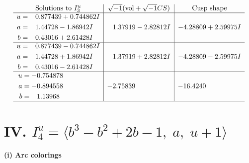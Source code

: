 \documentclass[1p]{elsarticle_modified}
\theoremstyle{definition}
\newcommand{\I}{\sqrt{-1}}
\begin{document}
$$\begin{array}{c|c|c}  
\text{Solutions to }I^u_{3}& \I (\text{vol} + \sqrt{-1}CS) & \text{Cusp shape}\\
 \hline 
\begin{aligned}
u &= \phantom{-}0.877439 + 0.744862 I \\
a &= \phantom{-}1.44728 - 1.86942 I \\
b &= \phantom{-}0.43016 + 2.61428 I\end{aligned}
 & \phantom{-}1.37919 - 2.82812 I & -4.28809 + 2.59975 I \\ \hline\begin{aligned}
u &= \phantom{-}0.877439 - 0.744862 I \\
a &= \phantom{-}1.44728 + 1.86942 I \\
b &= \phantom{-}0.43016 - 2.61428 I\end{aligned}
 & \phantom{-}1.37919 + 2.82812 I & -4.28809 - 2.59975 I \\ \hline\begin{aligned}
u &= -0.754878\phantom{ +0.000000I} \\
a &= -0.894558\phantom{ +0.000000I} \\
b &= \phantom{-}1.13968\phantom{ +0.000000I}\end{aligned}
 & -2.75839\phantom{ +0.000000I} & -16.4240\phantom{ +0.000000I}\\
 \hline 
 \end{array}$$\newpage\newpage\renewcommand{\arraystretch}{1}
\centering \section*{IV. $I^u_{4}= \langle b^3- b^2+2 b-1,\;a,\;u+1 \rangle$}
\flushleft \textbf{(i) Arc colorings}\\
\end{document}
